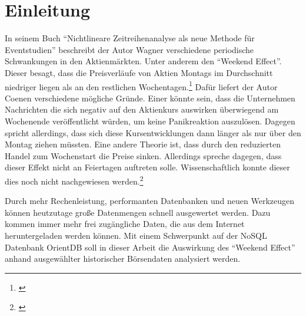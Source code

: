 \section{Einleitung}


In seinem Buch \enquote{Nichtlineare Zeitreihenanalyse als neue Methode für Eventstudien} beschreibt der Autor Wagner verschiedene periodische Schwankungen in den Aktienmärkten. Unter anderem den \enquote{Weekend Effect}. Dieser besagt, dass die Preisverläufe von Aktien Montags im Durchschnitt niedriger liegen als an den restlichen Wochentagen.\footnote{\cite[Vgl.][17]{Wagner2019}} Dafür liefert der Autor Coenen verschiedene mögliche Gründe. Einer könnte sein, dass die Unternehmen Nachrichten die sich negativ auf den Aktienkurs auswirken überwiegend am Wochenende veröffentlicht würden, um keine Panikreaktion auszulösen. Dagegen spricht allerdings, dass sich diese Kursentwicklungen dann länger als nur über den Montag ziehen müssten. Eine andere Theorie ist, dass durch den reduzierten Handel zum Wochenstart die Preise sinken. Allerdings spreche dagegen, dass dieser Effekt nicht an Feiertagen auftreten solle. Wissenschaftlich konnte dieser dies noch nicht nachgewiesen werden.\footnote{\cite[Vgl.][8]{Coenen2020}}

Durch mehr Rechenleistung, performanten Datenbanken und neuen Werkzeugen können heutzutage große Datenmengen schnell ausgewertet werden. Dazu kommen immer mehr frei zugängliche Daten, die aus dem Internet heruntergeladen werden können. Mit einem Schwerpunkt auf der NoSQL Datenbank OrientDB soll in dieser Arbeit die Auswirkung des \enquote{Weekend Effect} anhand ausgewählter historischer Börsendaten analysiert werden.

\clearpage